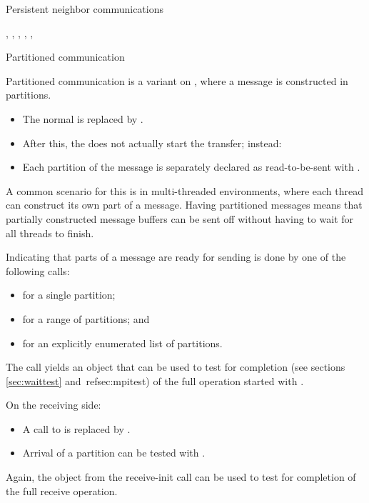  {Persistent neighbor communications}

\begin{mpifour}

,
,
,
,
,

\end{mpifour}

\begin{mpifour}
 {Partitioned communication}
\label{sec:psend}

Partitioned communication is a variant
on ,
where a message is constructed in partitions.
\begin{itemize}
\item The normal  is replaced
  by .
\item After this, the  does not
  actually start the transfer; instead:
\item Each partition of the message is separately
  declared as read-to-be-sent with .
\end{itemize}
A common scenario for this is in multi-threaded environments,
where each thread can construct its own part of a message.
Having partitioned messages means that partially constructed message buffers
can be sent off without having to wait for all threads to finish.

Indicating that parts of a message are ready for sending
is done by one of the following calls:
\begin{itemize}
\item {} for a single partition;
\item {} for a range of partitions; and
\item {} for an explicitly enumerated list of partitions.
\end{itemize}
The  call yields an  object
that can be used to test for completion
(see sections \ref{sec:waittest} and~ref{sec:mpitest})
of the full operation started with
.

On the receiving side:
\begin{itemize}
\item A call to  is replaced by
  .
\item Arrival of a partition can be tested with .  
\end{itemize}
Again, the  object from the receive-init call can
be used to test for completion of the full receive operation.

\end{mpifour}

